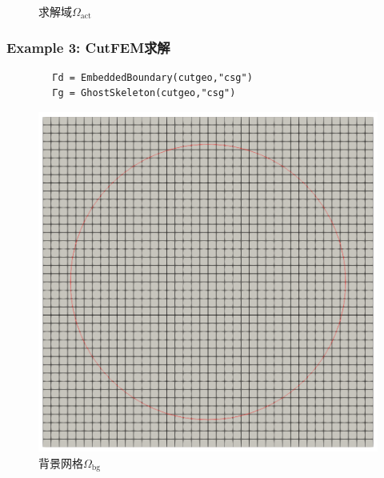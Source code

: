\documentclass[lang=en,aspectratio=43,theme=default,logo=on]{simplebeamer}
\begin{document}
\begin{frame}[fragile]
\begin{figure}
\begin{minipage}[t]{0.5\linewidth}
            \caption{求解域$\Omega_{\mathrm{act}}$}
        \end{minipage}
    \end{figure}
\end{frame}

\begin{frame}[fragile]
    \frametitle{Example 3: CutFEM求解}
    \begin{verbatim}
        Γd = EmbeddedBoundary(cutgeo,"csg")
        Γg = GhostSkeleton(cutgeo,"csg")
    \end{verbatim}
    \begin{figure}
        \centering %
        \begin{minipage}[t]{0.5\linewidth}
            \centering
            \includegraphics[height=0.5\textheight]{./img/011.png}
            \caption{背景网格$\Omega_{\mathrm{bg}}$}
        \end{minipage}%
        \begin{minipage}[t]{0.5\linewidth}
            \centering

\end{minipage}
\end{figure}
\end{frame}
\end{document}
